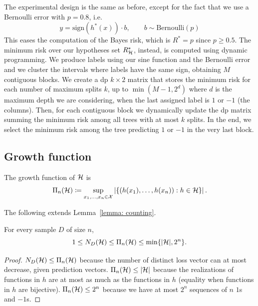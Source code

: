 \documentclass[reqno]{amsart}
\begin{document}
The experimental design is the same as before, except for the fact that we use a Bernoulli error with $p=0.8$, i.e. 
\[
y = \mathrm{sign}(h^*(x))\cdot b, \qquad b\sim \text{Bernoulli}(p)
\]
This eases the computation of the Bayes risk, which is $R^* = p$ since $p\ge0.5$. The minimum risk over our hypotheses set $R^*_{\mathcal{H}}$, instead, is computed using dynamic programming. We produce labels using our sine function and the Bernoulli error and we cluster the intervals where labels have the same sign, obtaining $M$ contiguous blocks. We create a dp $k\times 2$ matrix that stores the minimum risk for each number of maximum splits $k$, up to $\min(M-1, 2^d)$ where $d$ is the maximum depth we are considering, when the last assigned label is $1$ or $-1$ (the columns). Then, for each contiguous block we dynamically update the dp matrix summing the minimum risk among all trees with at most $k$ splits. In the end, we select the minimum risk among the tree predicting $1$ or $-1$ in the very last block. 


\subsection{Growth function}

\begin{definition}
    The growth function of $\mathcal{H}$ is
\[
 \Pi_{n}(\mathcal{H})\coloneq\sup_{x_1,\ldots,x_n\in\mathcal X}
 \left|\left\{(h(x_1),\ldots,h(x_n)):h\in\mathcal{H}\right\}\right|.
\]
\end{definition}

The following extends Lemma~\ref{lemma: counting}.

\begin{lemma}\label{lem:growth}
For every sample $D$ of size $n$,
\[
 1\le N_D(\mathcal{H})\le\Pi_{n}(\mathcal{H})\le\min\{|\mathcal{H}|,2^n\}.
\]

\begin{proof}
    $N_D(\mathcal{H}) \le \Pi_{n}(\mathcal{H})$ because the number of distinct loss vector can at most decrease, given prediction vectors. $\Pi_{n}(\mathcal{H})\le \vert\mathcal{H}\vert$ because the realizations of functions in $h$ are at most as much as the functions in $h$ (equality when functions in $h$ are bijective). $\Pi_{n}(\mathcal{H})\le 2^n$ because we have at most $2^n$ sequences of $n$ $1$s and $-1$s.
\end{proof}
\end{lemma}
\end{document}
